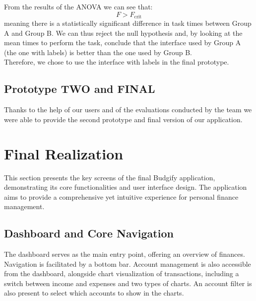 \documentclass[a4paper,12pt]{article}
\begin{document}
From the results of the ANOVA we can see that:\\
\[
F > F_{\text{crit}}
\]
meaning there is a statistically significant difference in task times between Group A and Group B. We can thus reject the null hypothesis and, by looking at the mean times to perform the task, conclude that the interface used by Group A (the one with labels) is better than the one used by Group B.\\
Therefore, we chose to use the interface with labels in the final prototype.

\subsection{Prototype TWO and FINAL}
Thanks to the help of our users and of the evaluations conducted by the team we were able to provide the second prototype and final version of our application.


\section{Final Realization}
\label{sec:final_realization}
This section presents the key screens of the final Budgify application, demonstrating its core functionalities and user interface design. The application aims to provide a comprehensive yet intuitive experience for personal finance management.

\subsection{Dashboard and Core Navigation}
The dashboard serves as the main entry point, offering an overview of finances. Navigation is facilitated by a bottom bar. Account management is also accessible from the dashboard, alongside chart visualization of transactions, including a switch between income and expenses and two types of charts. An account filter is also present to select which accounts to show in the charts.
\end{document}

